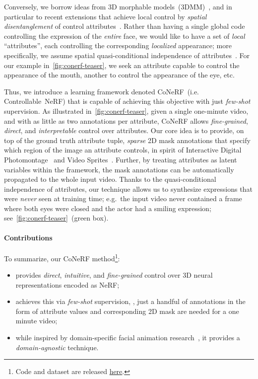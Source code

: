   Conversely, we borrow ideas from 3D morphable
  models~(3DMM)~\cite{blanz1999morphable}, and in particular to recent
  extensions that achieve local control by \textit{spatial disentanglement} of
  control attributes~\cite{wu2016anatomically,neumann2013sparse}.
  Rather than having a single global code controlling the expression of the
  \textit{entire} face, we would like to have a set of \textit{local}
  ``attributes'', each controlling the corresponding \textit{localized}
  appearance; more specifically, we assume spatial quasi-conditional
  independence of attributes~\cite{wu2016anatomically}.
  For our example in~\cref{fig:conerf-teaser}, we seek an attribute capable to
  control the appearance of the mouth, another to control the appearance of the
  eye, etc.

  Thus, we introduce a learning framework denoted
  CoNeRF~(i.e. Controllable~NeRF) that is capable of achieving this objective
  with just \textit{few-shot} supervision.
  As illustrated in~\cref{fig:conerf-teaser}, given a single one-minute video,
  and with as little as two annotations per attribute, CoNeRF allows
  \textit{fine-grained}, \textit{direct}, and \textit{interpretable} control
  over attributes.
  Our core idea is to provide, on top of the ground truth attribute tuple,
  \textit{sparse} 2D mask annotations that specify which region of the image an
  attribute controls, in spirit of Interactive Digital
  Photomontage~\cite{agarwala2004interactive} and Video
  Sprites~\cite{schodl2002controlled}.
  Further, by treating attributes as latent variables within the framework, the
  mask annotations can be automatically propagated to the whole input video.
  Thanks to the quasi-conditional independence of attributes, our technique
  allows us to synthesize expressions that were \textit{never} seen at training
  time; e.g.~the input video never contained a frame where both eyes were closed
  and the actor had a smiling expression; see~\cref{fig:conerf-teaser}~(green
  box).

  \paragraph{Contributions}
    To summarize, our CoNeRF method\footnote{Code and dataset are released
      \href{https://github.com/kacperkan/conerf}{here}.
    }:
    \begin{itemize}[leftmargin=*]
      \item provides \textit{direct}, \textit{intuitive}, and \textit{fine-grained} control over 3D neural representations encoded as NeRF;
      \item achieves this via \textit{few-shot} supervision, \eg, just a handful of annotations in the form of attribute values and corresponding 2D mask are needed for a one minute video;
      \item while inspired by domain-specific facial animation research~\cite{wu2016anatomically}, it provides a \textit{domain-agnostic} technique.
    \end{itemize}

    \color{black}

